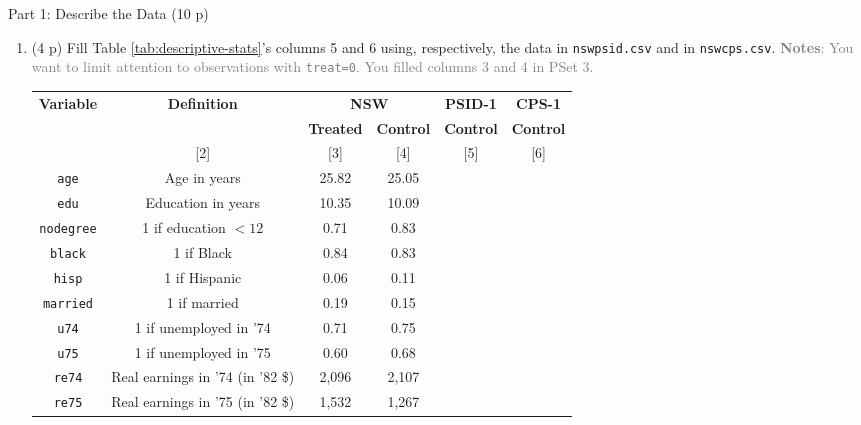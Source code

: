 \documentclass{article}
\begin{document}
\begin{center}
{\LARGE Part 1: Describe the Data (10 p)}
\end{center}

\begin{enumerate}[label=\textbf{Q\arabic{enumi}}.,ref=Q\arabic{enumi}, wide=0pt, itemsep=0em, topsep=5pt, labelindent=0pt]

\item (4 p) Fill Table \ref{tab:descriptive-stats}'s columns 5 and 6 using, respectively, the data in \texttt{nswpsid.csv} and in \texttt{nswcps.csv}. \textcolor{Gray}{\textbf{Notes}: You want to limit attention to observations with \texttt{treat=0}. You filled columns 3 and 4 in PSet 3.}


\begin{table}[ht!]
\centering
\begin{tabular}{cccccc}
\hline
\textbf{Variable} & \textbf{Definition} & \multicolumn{2}{c}{\textbf{NSW}}    & \textbf{PSID-1}  & \textbf{CPS-1}   \\ \cline{3-6} 
\textbf{}         & \textbf{}           & \textbf{Treated} & \textbf{Control} & \textbf{Control} & \textbf{Control} \\ 
\hline
[1] & [2] & [3] & [4] & [5] & [6] \\ \hline
\texttt{age}      & Age in years                     & 25.82 & 25.05 &       &        \\
\texttt{edu}      & Education in years               & 10.35 & 10.09 &       &        \\
\texttt{nodegree} & 1 if education $<12$             & 0.71  & 0.83  &       &        \\
\texttt{black}    & 1 if Black                       & 0.84  & 0.83  &       &        \\
\texttt{hisp}     & 1 if Hispanic                    & 0.06  & 0.11  &       &        \\
\texttt{married}  & 1 if married                     & 0.19  & 0.15  &       &        \\
\texttt{u74}      & 1 if unemployed in '74           & 0.71  & 0.75  &       &        \\
\texttt{u75}      & 1 if unemployed in '75           & 0.60  & 0.68  &       &        \\
\texttt{re74}     & Real earnings in '74 (in '82 \$) & 2,096 & 2,107 &       &        \\
\texttt{re75}     & Real earnings in '75 (in '82 \$) & 1,532 & 1,267 &       &        \\

\end{tabular}
\end{table}
\end{enumerate}
\end{document}

